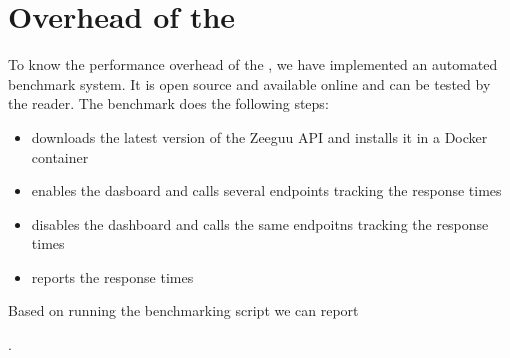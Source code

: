   

\section{Overhead of the \tool}
\label{sec:overhead}


To know the performance overhead of the \tool, we have implemented an automated benchmark system. It is open source and available online and can be tested by the reader. The benchmark does the following steps: 

\begin{itemize}
	\item downloads the latest version of the Zeeguu API and installs it in a Docker container
	\item enables the dasboard and calls several endpoints tracking the response times
	\item disables the dashboard and calls the same endpoitns tracking the response times
	\item reports the response times
\end{itemize}

Based on running the benchmarking script we can report 


.


  